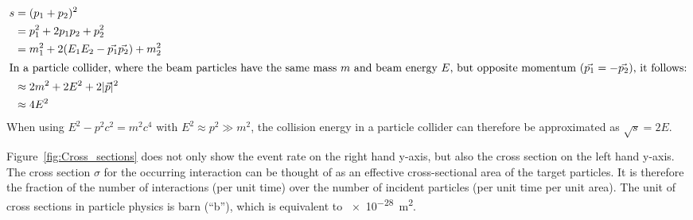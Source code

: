 \begin{align*}
 s &= (p_1+p_2)^2\\
 &=p_1^2+2p_1p_2+p_2^2\\
 &=m_1^2+2(E_1E_2-\vec{p_1}\vec{p_2})+m_2^2\\
\intertext{In a particle collider, where the beam particles have the same mass $m$ and beam energy $E$, but opposite momentum ($\vec{p_1}=-\vec{p_2}$), it follows:}
&\approx2m^2+2E^2+2|\vec{p}|^2\\
&\approx4E^2
\end{align*}
When using $E^2-p^2c^2=m^2c^4$ with $E^2\approx p^2 \gg m^2$, the collision energy in a particle collider can therefore be approximated as $\sqrt{s}=2E$.

Figure~\ref{fig:Cross_sections} does not only show the event rate on the right hand y-axis, but also the cross section on the left hand y-axis.
The cross section $\sigma$ for the occurring interaction can be thought of as an effective cross-sectional area of the target particles.
It is therefore the fraction of the number of interactions (per unit time) over the number of incident particles (per unit time per unit area).
The unit of cross sections in particle physics is barn (``b''), which is equivalent to \SI{e-28}{\meter\squared}.

